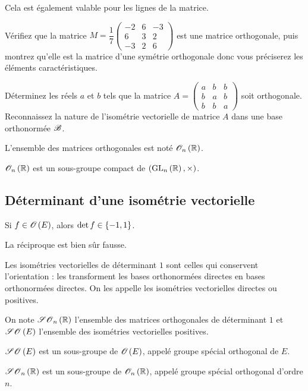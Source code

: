 Cela est également valable pour les lignes de la matrice.

\begin{exo}
Vérifiez que la matrice \(M=\dfrac{1}{7}\begin{pmatrix}
-2 & 6 & -3 \\
6 & 3 & 2 \\
-3 & 2 & 6
\end{pmatrix}\) est une matrice orthogonale, puis montrez qu'elle est la matrice d'une symétrie orthogonale donc vous préciserez les éléments caractéristiques.
\end{exo}

\begin{exo}
Déterminez les réels \(a\) et \(b\) tels que la matrice \(A=\begin{pmatrix}
a & b & b \\
b & a & b \\
b & b & a
\end{pmatrix}\) soit orthogonale. Reconnaissez la nature de l'isométrie vectorielle de matrice \(A\) dans une base orthonormée \(\mathscr{B}\).
\end{exo}

L'ensemble des matrices orthogonales est noté \(\Orth{n}[\R]\).

\begin{prop}
\(\Orth{n}[\R]\) est un sous-groupe compact de \(\groupe{\GL{n}[\R]}[\times]\).
\end{prop}

\subsection{Déterminant d'une isométrie vectorielle}

\begin{prop}
Si \(f\in\Orth{}[E]\), alors \(\det f\in\left\lbrace-1,1\right\rbrace\).
\end{prop}

La réciproque est bien sûr fausse.

Les isométries vectorielles de déterminant \(1\) sont celles qui conservent l'orientation : les transforment les bases orthonormées directes en bases orthonormées directes. On les appelle les isométries vectorielles directes ou positives.

On note \(\SO{n}[\R]\) l'ensemble des matrices orthogonales de déterminant \(1\) et \(\SO{}[E]\) l'ensemble des isométries vectorielles positives.

\begin{prop}
\(\SO{}[E]\) est un sous-groupe de \(\Orth{}[E]\), appelé groupe spécial orthogonal de \(E\).

\(\SO{n}[\R]\) est un sous-groupe de \(\Orth{n}[\R]\), appelé groupe spécial orthogonal d'ordre \(n\).
\end{prop}


